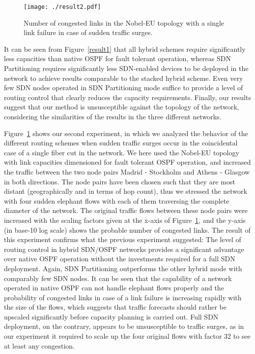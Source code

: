 \documentclass[10pt, conference]{IEEEtran}
\begin{document}
\begin{figure}[b!] \center
\texttt{[image: ./result2.pdf]}
\caption{Number of congested links in the Nobel-EU topology with a single link failure in case of sudden traffic surges.}
\label{result2} \end{figure}

It can be seen from Figure~\ref{result1} that all hybrid schemes require significantly less capacities than native OSPF for fault tolerant operation, whereas SDN Partitioning requires significantly less SDN-enabled devices to be deployed in the network to achieve results comparable to the stacked hybrid scheme. Even very few SDN nodes operated in SDN Partitioning mode suffice to provide a level of routing control that clearly reduces the capacity requirements. Finally, our results suggest that our method is unsusceptible against the topology of the network, considering the similarities of the results in the three different networks.

Figure~\ref{result2} shows our second experiment, in which we analyzed the behavior of the different routing schemes when sudden traffic surges occur in the coincidental case of a single fiber cut in the network. We here used the Nobel-EU topology with link capacities dimensioned for fault tolerant OSPF operation, and increased the traffic between the two node pairs Madrid - Stockholm and Athens - Glasgow in both directions. The node pairs have been chosen such that they are most distant (geographically and in terms of hop count), thus we stressed the network with four sudden elephant flows with each of them traversing the complete diameter of the network. The original traffic flows between these node pairs were increased with the scaling factors given at the x-axis of Figure~\ref{result2}, and the y-axis (in base-10 log scale) shows the probable number of congested links. The result of this experiment confirms what the previous experiment suggested: The level of routing control in hybrid SDN/OSPF networks provides a significant advantage over native OSPF operation without the investments required for a full SDN deployment. Again, SDN Partitioning outperforms the other hybrid mode with comparably few SDN nodes. It can be seen that the capability of a network operated in native OSPF can not handle elephant flows properly and the probability of congested links in case of a link failure is increasing rapidly with the size of the flows, which suggests that traffic forecasts should rather be upscaled significantly before capacity planning is carried out. Full SDN deployment, on the contrary, appears to be unsusceptible  to traffic surges, as in our experiment it required to scale up the four original flows with factor 32 to see at least any congestion.
\end{document}
